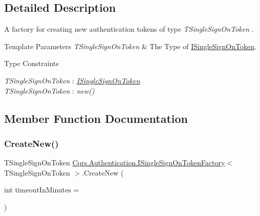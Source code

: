 \subsection{Detailed Description}
A factory for creating new authentication tokens of type {\itshape T\+Single\+Sign\+On\+Token} . 


\begin{DoxyTemplParams}{Template Parameters}
{\em T\+Single\+Sign\+On\+Token} & The Type of \hyperlink{interfaceCqrs_1_1Authentication_1_1ISingleSignOnToken}{I\+Single\+Sign\+On\+Token}.\\
\hline
\end{DoxyTemplParams}
\begin{Desc}
\item[Type Constraints]\begin{description}
\item[{\em T\+Single\+Sign\+On\+Token} : {\em \hyperlink{interfaceCqrs_1_1Authentication_1_1ISingleSignOnToken}{I\+Single\+Sign\+On\+Token}}]\item[{\em T\+Single\+Sign\+On\+Token} : {\em new()}]\end{description}
\end{Desc}


\subsection{Member Function Documentation}
\mbox{\label{interfaceCqrs_1_1Authentication_1_1ISingleSignOnTokenFactory_ad0795fb60ca13dd24db18556089e2834_ad0795fb60ca13dd24db18556089e2834}} 
\subsubsection{\texorpdfstring{Create\+New()}{CreateNew()}}
{\footnotesize\ttfamily T\+Single\+Sign\+On\+Token \hyperlink{interfaceCqrs_1_1Authentication_1_1ISingleSignOnTokenFactory}{Cqrs.\+Authentication.\+I\+Single\+Sign\+On\+Token\+Factory}$<$ T\+Single\+Sign\+On\+Token $>$.Create\+New (\begin{DoxyParamCaption}\item[{int}]{timeout\+In\+Minutes = {} }\end{DoxyParamCaption})}



